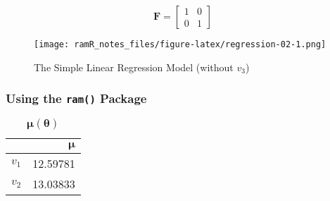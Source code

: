 \documentclass[
]{book}
\newenvironment{Shaded}{\begin{snugshade}}{\end{snugshade}}
\newcommand{\AttributeTok}[1]{\textcolor[rgb]{0.77,0.63,0.00}{#1}}
\newcommand{\ConstantTok}[1]{\textcolor[rgb]{0.00,0.00,0.00}{#1}}
\newcommand{\FunctionTok}[1]{\textcolor[rgb]{0.00,0.00,0.00}{#1}}
\newcommand{\NormalTok}[1]{#1}
\newcommand{\SpecialCharTok}[1]{\textcolor[rgb]{0.00,0.00,0.00}{#1}}
\newcommand{\StringTok}[1]{\textcolor[rgb]{0.31,0.60,0.02}{#1}}
\begin{document}
\begin{equation}
  \mathbf{F}
  =
  \begin{bmatrix}
    1 & 0 \\
    0 & 1
  \end{bmatrix}
\end{equation}

\begin{figure}
\centering
\texttt{[image: ramR\_notes\_files/figure-latex/regression-02-1.png]}
\caption{\label{fig:regression-02}The Simple Linear Regression Model (without \(v_3\))}
\end{figure}

\hypertarget{using-the-ram-package}{%
\subsubsection{\texorpdfstring{Using the \texttt{ram()} Package}{Using the ram() Package}}\label{using-the-ram-package}}

\begin{Shaded}
\end{Shaded}

\begin{table}

\caption{\label{tab:unnamed-chunk-6}$\boldsymbol{\mu} \left( \boldsymbol{\theta} \right)$}
\centering
\begin{tabular}[t]{l|r}
\hline
  & $\boldsymbol{\mu}$\\
\hline
$v_1$ & 12.59781\\
\hline
$v_2$ & 13.03833\\
\hline
\end{tabular}
\end{table}
\end{document}
